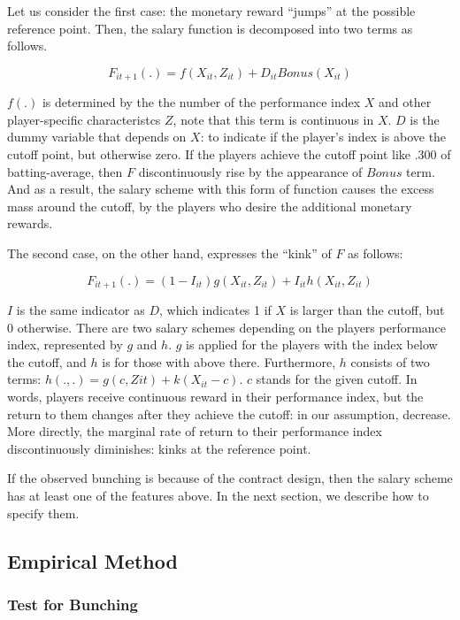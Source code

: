 \documentclass[dvipdfmx, 12pt]{article}
\begin{document}
\vspace{1zw}

Let us consider the first case: the monetary reward ``jumps'' at the possible reference point. Then, the salary function is decomposed into two terms as follows.

\[
F_{it+1}(.) = f(X_{it}, Z_{it}) + D_{it} \textit{Bonus}(X_{it})
\]

$f(.)$ is determined by the the number of the performance index $X$ and other player-specific characteristcs $Z$, note that this term is continuous in $X$. $D$ is the dummy variable that depends on $X$: to indicate if the player's index is above the cutoff point, but otherwise zero. If the players achieve the cutoff point like .300 of batting-average, then $F$ discontinuously rise by the appearance of $\textit{Bonus}$ term. And as a result, the salary scheme with this form of function causes the excess mass around the cutoff, by the players who desire the additional monetary rewards.

The second case, on the other hand, expresses the ``kink'' of $F$ as follows:

\[
F_{it+1}(.) = (1-I_{it})g(X_{it}, Z_{it}) + I_{it}h(X_{it}, Z_{it})
\]

$I$ is the same indicator as $D$, which indicates 1 if $X$ is larger than the cutoff, but 0 otherwise. There are two salary schemes depending on the players performance index, represented by $g$ and $h$. $g$ is applied for the players with the index below the cutoff, and $h$ is for those with above there. Furthermore, $h$ consists of two terms: $h(.,.) = g(c, Z{it}) + k(X_{it}-c)$. $c$ stands for the given cutoff. In words, players receive continuous reward in their performance index, but the return to them changes after they achieve the cutoff: in our assumption, decrease. More directly, the marginal rate of return to their performance index discontinuously diminishes: kinks at the reference point.

If the observed bunching is because of the contract design, then the salary scheme has at least one of the features above. In the next section, we describe how to specify them.

 \subsection{Empirical Method}

  \subsubsection{Test for Bunching}
\end{document}
